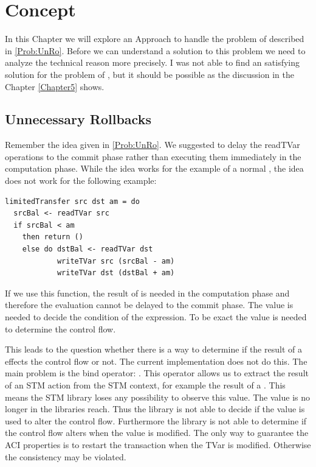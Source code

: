 
\chapter{Concept} %

\label{Chapter2} %

In this Chapter we will explore an Approach to handle the problem of  described in \ref{Prob:UnRo}.
Before we can understand a solution to this problem we need to analyze the technical reason more precisely. 
I was not able to find an satisfying solution for the problem of , but it should
be possible as the discussion in the Chapter \ref{Chapter5} shows.

\section{Unnecessary Rollbacks}
Remember the idea given in \ref{Prob:UnRo}. We suggested to delay the readTVar operations to the commit
phase rather than executing them immediately in the computation
phase. While the idea works for the example of a normal , the idea does not work 
for the following example:
\begin{lstlisting}
limitedTransfer src dst am = do 
  srcBal <- readTVar src
  if srcBal < am
    then return ()
    else do dstBal <- readTVar dst
            writeTVar src (srcBal - am)
            writeTVar dst (dstBal + am)
\end{lstlisting}
If we use this function, the result of  is needed in the computation phase and therefore 
the evaluation cannot be delayed to the commit phase. The value is needed to decide the condition of the 
 expression. To be exact the value is needed to determine the control flow. 

This leads to the question whether there is a way to determine if the result of a  effects the 
control flow or not. The current implementation does not do this. The main problem is the bind
operator: . This operator allows us to extract the result of an STM action 
from the STM context, for example the result of a . This means the STM library loses any possibility to 
observe this value. The value is no longer in the libraries reach. Thus the library is not able to decide if 
the value is used to alter the control flow. Furthermore the library is not able to determine if the control
flow alters when the value is modified. The only way to guarantee the ACI properties is to restart the 
transaction when the TVar is modified. Otherwise the consistency may be violated.

